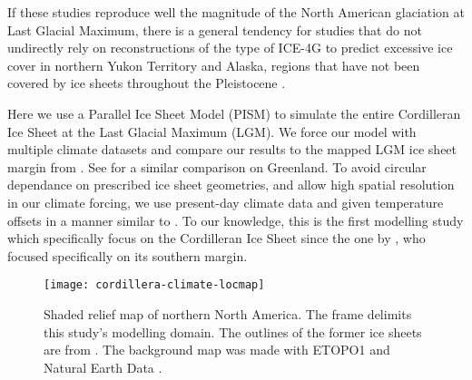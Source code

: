 If these studies reproduce well the magnitude of the North American glaciation at Last Glacial Maximum, there is a general tendency for studies that do not undirectly rely on reconstructions of the type of ICE-4G \citep{johnson-fastook-2002,bintanja-etal-2005,huybrechts-tsiobbel-1996,charbit-etal-2002,marshall-clarke-1999,tarasov-peltier-2004,zweck-huybrechts-2005,gregoire-etal-2012} to predict excessive ice cover in northern Yukon Territory and Alaska, regions that have not been covered by ice sheets throughout the Pleistocene \citep{dukrodkin-1999,kaufman-manley-2004}.

Here we use a Parallel Ice Sheet Model (PISM) \citep{web:pism} to simulate the entire Cordilleran Ice Sheet at the Last Glacial Maximum (LGM). We force our model with multiple climate datasets and compare our results to the mapped LGM ice sheet margin from \citet{kleman-etal-2010}. See \citet{quiquet-etal-2012} for a similar comparison on Greenland. To avoid circular dependance on prescribed ice sheet geometries, and allow high spatial resolution in our climate forcing, we use present-day climate data and given temperature offsets in a manner similar to \citet{bintanja-etal-2005}. To our knowledge, this is the first modelling study which specifically focus on the Cordilleran Ice Sheet since the one by \citep{robert-1991}, who focused specifically on its southern margin.

\begin{figure}[t]
	\vspace*{2mm}
	\begin{center}
		\texttt{[image: cordillera-climate-locmap]}
	\end{center}
	\caption{Shaded relief map of northern North America. The frame delimits this study's modelling domain. The outlines of the former ice sheets are from \citet{kleman-etal-2010}. The background map was made with ETOPO1 \citep{data:etopo1} and Natural Earth Data \citep{data:naturalearth}.}
	\label{fig:locmap}
\end{figure}

